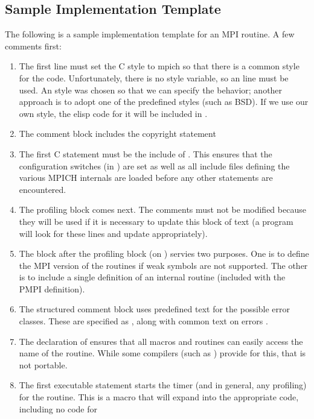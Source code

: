 \documentclass{article}
\begin{document}
\subsection{Sample Implementation Template}
\label{sec:template}

The following is a sample implementation template for an MPI routine.
A few comments first:
\begin{enumerate}
\item The first line must set the C style to mpich so that there is a common
      style for the code.  Unfortunately, there is no style variable, so an
       line must be used.  An  style was chosen so that 
      we can specify the behavior; another approach is to adopt one
      of the predefined styles (such as BSD).  If we use our own
      style, the elisp code for it will be included in .
\item The comment block includes the copyright statement
\item The first C statement must be the include of .  This
  ensures that the configuration switches (in ) are set as
  well as all include files defining the various MPICH internals are loaded
  before any other statements are encountered.
\item The profiling block comes next.  The comments must not be modified
  because they will be used if it is necessary to update this block of text (a
  program will look for these lines and update appropriately).
\item The block after the profiling block (on )
  servies two purposes.  One is to define the MPI version of the routines if
  weak symbols are not supported.  The other is to include a single definition
  of an internal routine (included with the PMPI definition).
\item The structured comment block uses predefined text for the possible error
  classes.  These are specified as , along with common text on
  errors .
\item The declaration of  ensures that all macros and
routines can easily access the name of the routine.  While some
compilers (such as ) provide  for this,
that is not portable.
\item 
The first executable statement starts the timer (and in general,
any profiling) for the routine.  This
  is a macro that will expand into the appropriate code, including no code for

\end{enumerate}
\end{document}
